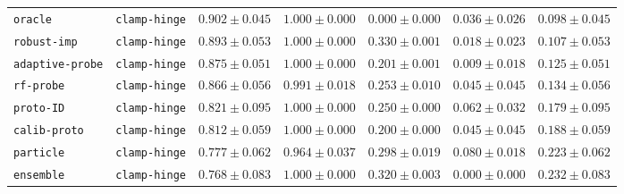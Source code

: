 \documentclass{article}
\begin{document}
\begin{center}
{\begin{tabular}{llccccc}
\texttt{oracle} & \texttt{clamp-hinge} & $0.902 \pm 0.045$ & $1.000 \pm 0.000$ & $0.000 \pm 0.000$ & $0.036 \pm 0.026$ & $0.098 \pm 0.045$ \\
\texttt{robust-imp} & \texttt{clamp-hinge} & $0.893 \pm 0.053$ & $1.000 \pm 0.000$ & $0.330 \pm 0.001$ & $0.018 \pm 0.023$ & $0.107 \pm 0.053$ \\
\texttt{adaptive-probe} & \texttt{clamp-hinge} & $0.875 \pm 0.051$ & $1.000 \pm 0.000$ & $0.201 \pm 0.001$ & $0.009 \pm 0.018$ & $0.125 \pm 0.051$ \\
\texttt{rf-probe} & \texttt{clamp-hinge} & $0.866 \pm 0.056$ & $0.991 \pm 0.018$ & $0.253 \pm 0.010$ & $0.045 \pm 0.045$ & $0.134 \pm 0.056$ \\
\texttt{proto-ID} & \texttt{clamp-hinge} & $0.821 \pm 0.095$ & $1.000 \pm 0.000$ & $0.250 \pm 0.000$ & $0.062 \pm 0.032$ & $0.179 \pm 0.095$ \\
\texttt{calib-proto} & \texttt{clamp-hinge} & $0.812 \pm 0.059$ & $1.000 \pm 0.000$ & $0.200 \pm 0.000$ & $0.045 \pm 0.045$ & $0.188 \pm 0.059$ \\
\texttt{particle} & \texttt{clamp-hinge} & $0.777 \pm 0.062$ & $0.964 \pm 0.037$ & $0.298 \pm 0.019$ & $0.080 \pm 0.018$ & $0.223 \pm 0.062$ \\
\texttt{ensemble} & \texttt{clamp-hinge} & $0.768 \pm 0.083$ & $1.000 \pm 0.000$ & $0.320 \pm 0.003$ & $0.000 \pm 0.000$ & $0.232 \pm 0.083$ \\
\bottomrule
\end{tabular}%
}
\end{center}
\end{document}

